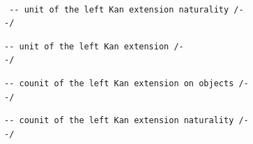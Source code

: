 \documentclass{book}
\theoremstyle{definition}
\newcounter{lcounter}
\begin{document}
\begin{center} \begin{tcolorbox}[width=5in,colback={white},title={\begin{center}\texttt{Lean \thelcounter} \addtocounter{lcounter}{1} \end{center}},colbacktitle=Blue,coltitle=black] \begin{verbatim}

 -- unit of the left Kan extension naturality /-
-/
\end{verbatim} \end{tcolorbox} \end{center}
\begin{center} \begin{tcolorbox}[width=5in,colback={white},title={\begin{center}\texttt{Lean \thelcounter} \addtocounter{lcounter}{1} \end{center}},colbacktitle=Blue,coltitle=black] \begin{verbatim}
-- unit of the left Kan extension /-
-/
\end{verbatim} \end{tcolorbox} \end{center}
\begin{center} \begin{tcolorbox}[width=5in,colback={white},title={\begin{center}\texttt{Lean \thelcounter} \addtocounter{lcounter}{1} \end{center}},colbacktitle=Blue,coltitle=black] \begin{verbatim}
-- counit of the left Kan extension on objects /-
-/
\end{verbatim} \end{tcolorbox} \end{center}
\begin{center}

 \begin{tcolorbox}[width=5in,colback={white},title={\begin{center}\texttt{Lean \thelcounter} \addtocounter{lcounter}{1} \end{center}},colbacktitle=Blue,coltitle=black] \begin{verbatim}
-- counit of the left Kan extension naturality /-
-/
\end{verbatim} \end{tcolorbox} \end{center}
\end{document}
